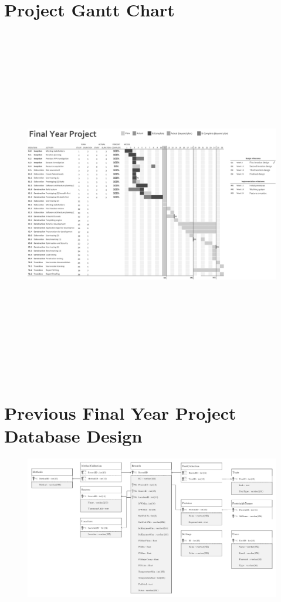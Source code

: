 \newpage
\section{Project Gantt Chart}
\label{appendix:project-gantt-chart}

\begin{figure}[H]
  \centering
  \includegraphics[height=6.1in,angle=90]{assets/gantt-plan.png}
\end{figure}

\newpage
\section{Previous Final Year Project Database Design}
\label{appendix:previous-fyp-uml}

\begin{figure}[H]
  \centering
  \includegraphics[width=10in,angle=90]{assets/uml-previous-fyp-database.pdf}
\end{figure}
